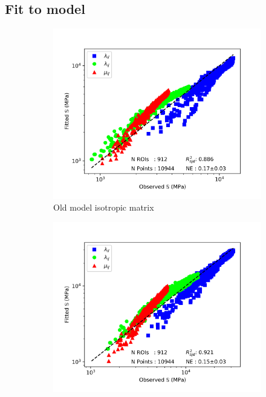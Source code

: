 \documentclass[a4paper,fleqn]{DC_ArtStyle}
\begin{document}
	\clearpage
	\subsection{Fit to model}
	\begin{figure}
		\centering
		\begin{subfigure}[b]{0.45\linewidth}
			\includegraphics[width=\linewidth]{RegressionFabric_Isotropic}
			\caption{Old model isotropic matrix}
		\end{subfigure}
		\begin{subfigure}[b]{0.45\linewidth}
			\includegraphics[width=\linewidth]{RegressionFabric_Transverse}

\end{subfigure}
\end{figure}
\end{document}
